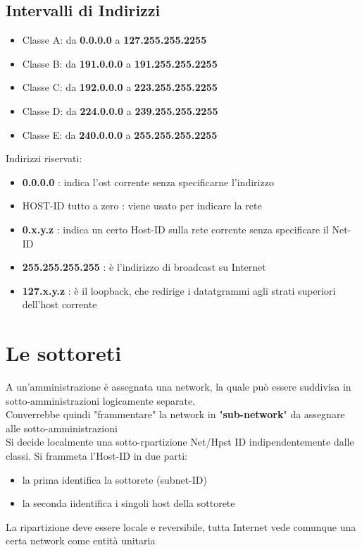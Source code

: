 \documentclass{report}
\begin{document}
            \subsection{Intervalli di Indirizzi}
                \begin{itemize}
                    \item Classe A: da \textbf{0.0.0.0} a \textbf{127.255.255.2255}
                    \item Classe B: da \textbf{191.0.0.0} a \textbf{191.255.255.2255}
                    \item Classe C: da \textbf{192.0.0.0} a \textbf{223.255.255.2255}
                    \item Classe D: da \textbf{224.0.0.0} a \textbf{239.255.255.2255}
                    \item Classe E: da \textbf{240.0.0.0} a \textbf{255.255.255.2255}
                \end{itemize}
            Indirizzi riservati: 
            \begin{itemize}
                \item \textbf{0.0.0.0} : indica l'ost corrente senza specificarne l'indirizzo
                \item HOST-ID tutto a zero : viene usato per indicare la rete
                \item \textbf{0.x.y.z} : indica un certo Host-ID sulla rete corrente senza specificare il Net-ID
                \item \textbf{255.255.255.255} : è l'indirizzo di broadcast su Internet
                \item \textbf{127.x.y.z} : è il loopback, che redirige i datatgrammi agli strati superiori dell'host corrente 
            \end{itemize}
        \section{Le sottoreti}
            A un'amministrazione è assegnata una network, la quale può essere suddivisa in sotto-amministrazioni logicamente separate.
            \\
            Converrebbe quindi "frammentare" la network in "\textbf{sub-network}" da assegnare alle sotto-amministrazioni
            \\
            Si decide localmente una sotto-rpartizione Net/Hpst ID indipendentemente dalle classi. Si frammeta l'Host-ID in due parti:
            \begin{itemize}
                \item la prima identifica la sottorete (subnet-ID)
                \item la seconda iidentifica i singoli host della sottorete
            \end{itemize}
            La ripartizione deve essere locale e reversibile, tutta Internet vede comunque una certa network come entità unitaria
\end{document}
